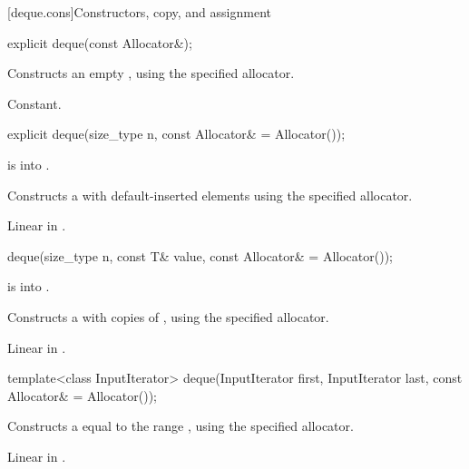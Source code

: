 [deque.cons]{Constructors, copy, and assignment}

%
\begin{itemdecl}
explicit deque(const Allocator&);
\end{itemdecl}

\begin{itemdescr}
\pnum
\effects
Constructs an empty
,
using the specified allocator.

\pnum
\complexity
Constant.
\end{itemdescr}

%
\begin{itemdecl}
explicit deque(size_type n, const Allocator& = Allocator());
\end{itemdecl}

\begin{itemdescr}
\pnum
\expects
{} is  into .

\pnum
\effects
Constructs a  with
 default-inserted elements using the specified allocator.

\pnum
\complexity
Linear in .
\end{itemdescr}

%
\begin{itemdecl}
deque(size_type n, const T& value, const Allocator& = Allocator());
\end{itemdecl}

\begin{itemdescr}
\pnum
\expects
{} is  into .

\pnum
\effects
Constructs a
with  copies of ,
using the specified allocator.

\pnum
\complexity
Linear in .
\end{itemdescr}

%
\begin{itemdecl}
template<class InputIterator>
  deque(InputIterator first, InputIterator last, const Allocator& = Allocator());
\end{itemdecl}

\begin{itemdescr}
\pnum
\effects
Constructs a
equal to the range
,
using the specified allocator.

\pnum
\complexity
Linear in .
\end{itemdescr}

